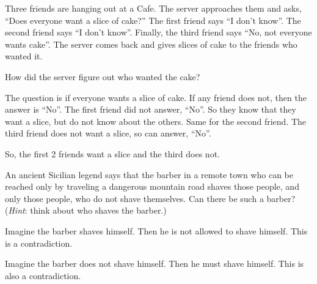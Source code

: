 \documentclass[a4paper]{exam}
\begin{document}
\begin{questions}
  
  \question Three friends are hanging out at a Cafe. The server approaches them and asks, ``Does everyone want a slice of cake?'' The first friend says ``I don’t know''. The second friend says ``I don’t know''. Finally, the third friend says ``No, not everyone wants cake''. The server comes back and gives slices of cake to the friends who wanted it. 

  How did the server figure out who wanted the cake?
  \begin{solution}
    The question is if everyone wants a slice of cake. If any friend does not, then the answer is ``No''. The first friend did not answer, ``No''. So they know that they want a slice, but do not know about the others. Same for the second friend. The third friend does not want a slice, so can answer, ``No''.

    So, the first 2 friends want a slice and the third does not.
  \end{solution}
  
  \question An ancient Sicilian legend says that the barber in a remote town who can be reached only by traveling a dangerous mountain road shaves those people, and only those people, who do not shave themselves. Can there be such a barber? (\textit{Hint}: think about who shaves the barber.)
  \begin{solution}
    Imagine the barber shaves himself. Then he is not allowed to shave himself. This is a contradiction.

    Imagine the barber does not shave himself. Then he must shave himself. This is also a contradiction.


\end{solution}
\end{questions}
\end{document}
